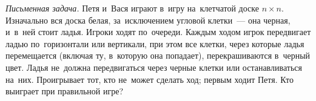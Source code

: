 \begin{problems}

\item
\emph{Письменная задача.}
Петя и~Вася играют в~игру на~клетчатой доске $n \times n$.
Изначально вся доска белая, за~исключением угловой клетки~--- она черная,
и~в~ней стоит ладья.
Игроки ходят по~очереди.
Каждым ходом игрок передвигает ладью по~горизонтали или вертикали, при этом все
клетки, через которые ладья перемещается (включая ту, в~которую она попадает),
перекрашиваются в~черный цвет.
Ладья не~должна передвигаться через черные клетки или останавливаться на~них.
Проигрывает тот, кто не~может сделать ход;
первым ходит Петя.
Кто выиграет при правильной игре?

\end{problems}

